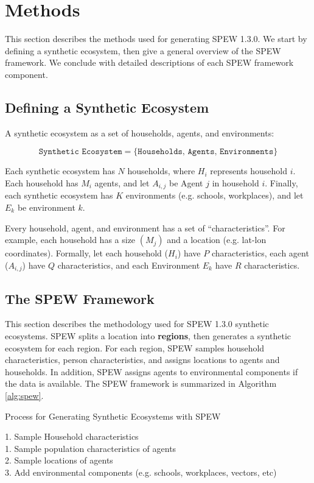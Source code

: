 \documentclass[font=9pt]{article}
\begin{document}
\newpage
\section{Methods} 
\label{sec:methods}

This section describes the methods used for generating SPEW 1.3.0. We start by defining a synthetic ecosystem, then give a general overview of the SPEW framework. We conclude with detailed descriptions of each SPEW framework component. 

\subsection{Defining a Synthetic Ecosystem}
A synthetic ecosystem as a set of households, agents, and environments:

\vspace{-1em}
\begin{equation}
	\texttt{Synthetic Ecosystem} =  \{\texttt{Households, Agents, Environments}\}
\end{equation}

Each synthetic ecosystem has $N$ households, where $H_i$ represents household $i$. Each household has $M_i$ agents, and let $A_{i, j}$ be Agent $j$ in household $i$. Finally, each synthetic ecosystem has $K$ environments (e.g. schools, workplaces), and let $E_k$ be environment $k$. 

Every household, agent, and environment has a set of ``characteristics''. For example, each household has a size $(M_j)$ and a location (e.g. lat-lon coordinates). Formally, let each household ($H_i$) have $P$ characteristics, each agent ($A_{i, j}$) have $Q$ characteristics, and each Environment $E_k$ have $R$ characteristics. 

\subsection{The SPEW Framework}
This section describes the methodology used for SPEW 1.3.0 synthetic ecosystems. SPEW splits a location into {\bf regions}, then generates a synthetic ecosystem for each region. For each region, SPEW samples household characteristics, person characteristics, and assigns locations to agents and households. In addition, SPEW assigns agents to environmental components if the data is available. The SPEW framework is summarized in Algorithm \ref{alg:spew}. 
\begin{algorithm}
\caption{Process for Generating Synthetic Ecosystems with SPEW } 
\label{alg:spew}
\SetAlgoLined
{}
  {
  1. Sample Household characteristics \\
  1. Sample population characteristics of agents \\
  2. Sample locations of agents \\
  3. Add environmental components (e.g. schools, workplaces, vectors, etc)\\
  }
\end{algorithm}
\end{document}
